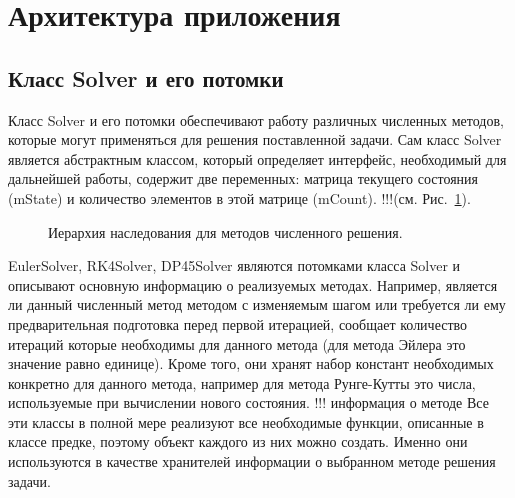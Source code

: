 \documentclass[a4paper, 14pt]{article}
\theoremstyle{definition}
\begin{document}
\newpage
\section{Архитектура приложения}

\subsection{Класс Solver и его потомки}

\par Класс Solver и его потомки обеспечивают работу различных численных методов, которые могут применяться для решения поставленной задачи. Сам класс Solver является абстрактным классом, который определяет интерфейс, необходимый для дальнейшей работы, содержит две переменных: матрица текущего состояния (mState) и количество элементов в этой матрице (mCount). !!!(см. Рис.~\ref{ris:solvers}).

\begin{figure}[h]
	\caption{Иерархия наследования для методов численного решения.}
	\label{ris:solvers}
\end{figure}

\par EulerSolver, RK4Solver, DP45Solver являются потомками класса Solver и описывают основную информацию о реализуемых методах. Например, является ли данный численный метод методом с изменяемым шагом или требуется ли ему предварительная подготовка перед первой итерацией, сообщает количество итераций которые необходимы для данного метода (для метода Эйлера это значение равно единице). Кроме того, они хранят набор констант необходимых конкретно для данного метода, например для метода Рунге-Кутты это числа, используемые при вычислении нового состояния.
!!! информация о методе 
Все эти классы в полной мере реализуют все необходимые функции, описанные в классе предке, поэтому объект каждого из них можно создать. Именно они используются в качестве хранителей информации о выбранном методе решения задачи.
\end{document}
